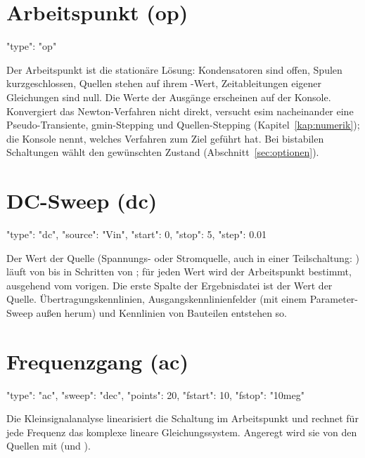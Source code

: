 \section{Arbeitspunkt (op)}

\begin{json}
{ "type": "op" }
\end{json}

Der Arbeitspunkt ist die stationäre Lösung: Kondensatoren sind offen,
Spulen kurzgeschlossen, Quellen stehen auf ihrem -Wert,
Zeitableitungen eigener Gleichungen sind null. Die Werte der Ausgänge
erscheinen auf der Konsole. Konvergiert das Newton-Verfahren nicht direkt,
versucht esim nacheinander eine Pseudo-Transiente, gmin-Stepping und
Quellen-Stepping (Kapitel~\ref{kap:numerik}); die Konsole nennt, welches
Verfahren zum Ziel geführt hat. Bei bistabilen Schaltungen wählt
 den gewünschten Zustand (Abschnitt~\ref{sec:optionen}).

\section{DC-Sweep (dc)}

\begin{json}
{ "type": "dc", "source": "Vin", "start": 0, "stop": 5, "step": 0.01 }
\end{json}

Der Wert der Quelle  (Spannungs- oder Stromquelle, auch in
einer Teilschaltung: ) läuft von  bis 
in Schritten von ; für jeden Wert wird der Arbeitspunkt
bestimmt, ausgehend vom vorigen. Die erste Spalte der Ergebnisdatei ist der
Wert der Quelle. Übertragungskennlinien, Ausgangskennlinienfelder (mit einem
Parameter-Sweep außen herum) und Kennlinien von Bauteilen entstehen so.

\section{Frequenzgang (ac)}

\begin{json}
{ "type": "ac", "sweep": "dec", "points": 20, "fstart": 10, "fstop": "10meg" }
\end{json}

Die Kleinsignalanalyse linearisiert die Schaltung im Arbeitspunkt und
rechnet für jede Frequenz das komplexe lineare Gleichungssystem. Angeregt
wird sie von den Quellen mit  (und ).

